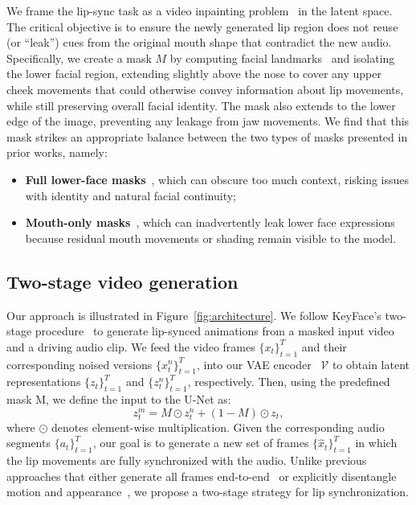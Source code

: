 We frame the lip-sync task as a video inpainting problem~\cite{QuanCLYW24, SahariaCCLHSF022} in the latent space. The critical objective is to ensure the newly generated lip region does not reuse (or “leak”) cues from the original mouth shape that contradict the new audio. Specifically, we create a mask $M$ by computing facial landmarks~\cite{facealign} and isolating the lower facial region, extending slightly above the nose to cover any upper cheek movements that could otherwise convey information about lip movements, while still preserving overall facial identity. The mask also extends to the lower edge of the image, preventing any leakage from jaw movements. We find that this mask strikes an appropriate balance between the two types of masks presented in prior works, namely:
\begin{itemize}
    \item \textbf{Full lower-face masks}~\cite{stylepres, DiffTalk, diff2lip, SyncTalkFace}, which can obscure too much context, risking issues with identity and natural facial continuity;
    \item \textbf{Mouth-only masks}~\cite{DINet, DiffDub, StyleLipSync, VideoReTalking}, which can inadvertently leak lower face expressions because residual mouth movements or shading remain visible to the model.
\end{itemize}

\subsection{Two-stage video generation}
\label{sec:pipeline}
Our approach is illustrated in Figure~\ref{fig:architecture}. We follow KeyFace's two-stage procedure~\cite{keyface} to generate lip-synced animations from a masked input video and a driving audio clip. We feed the video frames $\{x_t\}_{t=1}^T$ and their corresponding noised versions $\{x^n_t\}_{t=1}^T$, into our VAE encoder~\cite{blattmann2023stablevideodiffusionscaling} $\mathcal{V}$ to obtain latent representations $\{z_t\}_{t=1}^T$ and $\{z^n_t\}_{t=1}^T$, respectively. Then, using the predefined mask M, we define the input to the U-Net as:
\begin{equation}
    z_t^m = M \odot z^n_t + (1 - M) \odot z_t,
\end{equation}
where $\odot$ denotes element-wise multiplication.
Given the corresponding audio segments $\{a_t\}_{t=1}^T$, our goal is to generate a new set of frames $\{\hat{x}_t\}_{t=1}^T$ in which the lip movements are fully synchronized with the audio.
Unlike previous approaches that either generate all frames end-to-end~\cite{StyleLipSync, talklip, latentsync} or explicitly disentangle motion and appearance~\cite{DiffDub, stylepres, maketalk}, we propose a two-stage strategy for lip synchronization.

